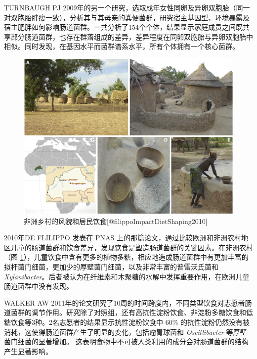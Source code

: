 \documentclass[]{ctexbook}
\begin{document}
TURNBAUGH PJ 2009年的另一个研究，选取成年女性同卵及异卵双胞胎（同一对双胞胎胖瘦一致），分析其与其母亲的粪便菌群，研究宿主基因型、环境暴露及宿主肥胖如何影响肠道菌群\citep{turnbaughCoreGutMicrobiome2009}。一共分析了154个个体，结果显示家庭成员之间既共享部分肠道菌群，也存在群落组成的差异，差异程度在同卵双胞胎与异卵双胞胎中相似。同时发现，在基因水平而菌群谱系水平，所有个体拥有一个核心菌群。

\begin{figure}
\includegraphics[width=1\linewidth]{images/filippoImpactDietShaping2010_fig1} \caption{非洲乡村的风貌和居民饮食[@filippoImpactDietShaping2010]}\label{fig:filippoImpactDietShaping2010-fig1}
\end{figure}

2010年DE FLILIPPO 发表在 PNAS 上的那篇论文，通过比较欧洲和非洲农村地区儿童的肠道菌群和饮食差异，发现饮食是塑造肠道菌群的关键因素\citep{filippoImpactDietShaping2010}。在非洲农村（图 \ref{fig:filippoImpactDietShaping2010-fig1}），儿童饮食中含有更多的植物多糖，相应地造成肠道菌群中有更加丰富的拟杆菌门细菌，更加少的厚壁菌门细菌，以及非常丰富的普雷沃氏菌和 \emph{Xylanibacter}。后者被认为在纤维素和木聚糖的水解中发挥重要作用，在欧洲儿童肠道菌群中没有发现。

WALKER AW 2011年的论文研究了10周的时间跨度内，不同类型饮食对志愿者肠道菌群的调节作用\citep{walkerDominantDietresponsiveGroups2011}。研究除了对照组，还有高抗性淀粉饮食、非淀粉多糖饮食和低糖饮食等3种。2名志愿者的结果显示抗性淀粉饮食中 60\% 的抗性淀粉仍然没有被消耗，这使得肠道菌群产生了明显的变化，包括瘤胃球菌和 \emph{Oscillibacter} 等厚壁菌门细菌的显著增加。
这表明食物中不可被人类利用的成分会对肠道菌群的结构产生显著影响。
\end{document}
